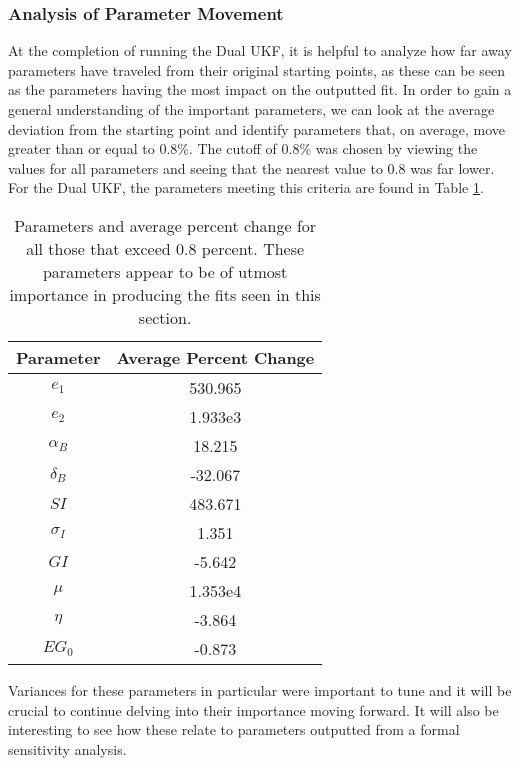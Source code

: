 \documentclass{article}
\begin{document}
\subsubsection{Analysis of Parameter Movement}
At the completion of running the Dual UKF, it is helpful to analyze how far away parameters have traveled from their original starting points, as these can be seen as the parameters having the most impact on the outputted fit. In order to gain a general understanding of the important parameters, we can look at the average deviation from the starting point and identify parameters that, on average, move greater than or equal to 0.8\%. The cutoff of 0.8\% was chosen by viewing the values for all parameters and seeing that the nearest value to 0.8 was far lower. For the Dual UKF, the parameters meeting this criteria are found in Table \ref{table:T1D_Dual_ParamChange}.

\begin{table}[H]
  \begin{center}
    \label{tab:table1}
    \begin{tabular}{c|c} %
      \textbf{Parameter} & \textbf{Average Percent Change} \\
      \hline
      \textbf{$e_1$} & 530.965\\
      \textbf{$e_2$} & 1.933e3\\
      \textbf{$\alpha_B$} & 18.215\\
      \textbf{$\delta_B$} & -32.067\\
      \textbf{$SI$} & 483.671\\
      \textbf{$\sigma_I$} & 1.351\\
      \textbf{$GI$} & -5.642\\
      \textbf{$\mu$} & 1.353e4\\
      \textbf{$\eta$} & -3.864\\
      \textbf{$EG_0$} & -0.873
    \end{tabular}
    \caption{Parameters and average percent change for all those that exceed 0.8 percent. These parameters appear to be of utmost importance in producing the fits seen in this section.}
    \label{table:T1D_Dual_ParamChange}
  \end{center}
\end{table}

Variances for these parameters in particular were important to tune and it will be crucial to continue delving into their importance moving forward. It will also be interesting to see how these relate to parameters outputted from a formal sensitivity analysis.
\end{document}
